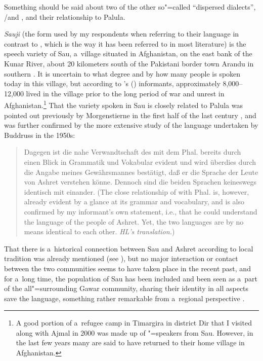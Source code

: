 \largerpage 
Something should be said about two of the other so"=called ``dispersed dialects'', \iliSawi/\iliSauji and \iliKalkoti, and their relationship to Palula. 


\textit{Sauji} (the form used by my respondents when referring to their language in contrast to
\iliSawi, which is the way it has been referred to in most literature) is the speech variety of Sau,
a~village situated in Afghanistan, on the east bank of the Kunar River, about 20 kilometers south of
the Pakistani border town Arandu in southern \iliChitral. It is uncertain to what degree and by how many
people \iliSauji is spoken today in this village, but according to \citeauthor{decker1992a}'s
(\citeyear{decker1992a}) informants, approximately 8,000--12,000 lived in the village prior to the
long period of war and unrest in Afghanistan.\footnote{A good portion of a~refugee camp in Timargira
  in district Dir that I visited along with Ajmal \iliNuristani in 2000 was made up of \iliSauji"=speakers
  from Sau. However, in the last few years many are said to have returned to their home village in
  Afghanistan.} That the variety spoken in Sau is closely related to Palula was pointed out
previously by Morgenstierne in the first half of the last century \citep[7]{morgenstierne1941}, and
was further confirmed by the more extensive study of the language undertaken by Buddruss in the
1950s:

\begin{quote}
Dagegen ist die nahe Verwandtschaft des \iliSawi mit dem Phal. bereits durch einen Blick in Grammatik und Vokabular evident und wird überdies durch die Angabe meines Gewährsmannes bestätigt, daß er die Sprache der Leute von Ashret verstehen könne. Dennoch sind die beiden Sprachen keineswegs identisch mit einander. (The close relationship of \iliSawi with Phal. is, however, already evident by a glance at its grammar and vocabulary, and is also confirmed by my informant's own statement, i.e., that he could understand the language of the people of Ashret. Yet, the two languages are by no means identical to each other. \textit{HL's translation.}) \citep[11]{buddruss1967}
\end{quote}


That there is a~historical connection between Sau and Ashret according to local tradition was
already mentioned (see ), but no major interaction or
contact between the two communities seems to have taken place in the recent past, and for a~long
time, the population of Sau has been included and been seen as a~part of the all"=surrounding Gawar
community, sharing their identity in all aspects save the language, something rather remarkable from
a~regional perspective \citep[232]{cacopardo2001}.
 
